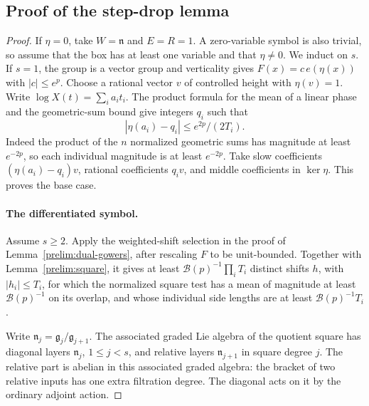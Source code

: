 \subsection{Proof of the step-drop lemma}


\begin{proof}
If $\eta=0$, take $W=\mathfrak n$ and $E=R=1$.  A zero-variable
symbol is also trivial, so assume that the box has at least one
variable and that $\eta\ne0$.
We induct on $s$.  If $s=1$, the group is a vector group and
verticality gives $F(x)=c\,e(\eta(x))$ with $|c|\leq e^p$.
Choose a rational
vector $v$ of controlled height with $\eta(v)=1$.  Write
$\log X(t)=\sum_i a_it_i$.  The product formula for the mean of
a linear phase and the geometric-sum bound give integers $q_i$
such that
\[
 |\eta(a_i)-q_i|\leq e^{2p}/(2T_i).
\]
Indeed the product of the $n$ normalized geometric sums has
magnitude at least $e^{-2p}$, so each individual magnitude is
at least $e^{-2p}$.  Take slow coefficients
$(\eta(a_i)-q_i)v$, rational coefficients $q_iv$, and middle
coefficients in $\ker\eta$.  This proves the base case.

\paragraph{The differentiated symbol.}
Assume $s\geq2$.  Apply the weighted-shift selection in the proof
of Lemma~\ref{prelim:dual-gowers}, after rescaling $F$ to be
unit-bounded.  Together with Lemma~\ref{prelim:square}, it gives at least
$\mathcal B(p)^{-1}\prod_iT_i$ distinct shifts $h$, with
$|h_i|\leq T_i$, for which the normalized square test has a mean
of magnitude at least $\mathcal B(p)^{-1}$ on its overlap, and whose
individual side lengths are at least $\mathcal B(p)^{-1}T_i$.

Write $\mathfrak n_j=\mathfrak g_j/\mathfrak g_{j+1}$.
The associated graded Lie algebra of the quotient square has
diagonal layers $\mathfrak n_j$, $1\leq j<s$, and relative
layers $\mathfrak n_{j+1}$ in square degree $j$.  The relative
part is abelian in this associated graded algebra: the bracket
of two relative inputs has one extra filtration degree.  The
diagonal acts on it by the ordinary adjoint action.


\end{proof}
